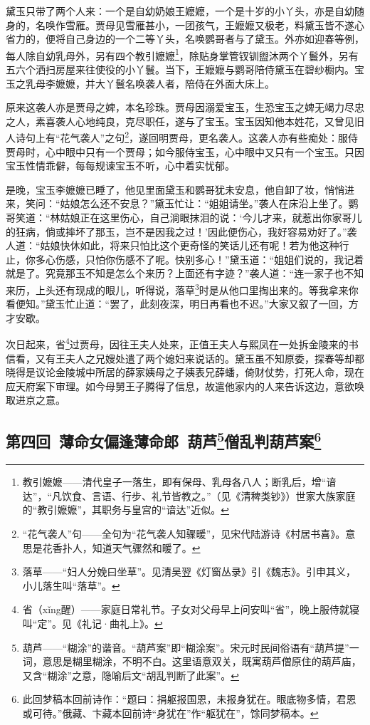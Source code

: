 \par 黛玉只带了两个人来：一个是自幼奶娘王嬷嬷，一个是十岁的小丫头，亦是自幼随身的，名唤作雪雁。贾母见雪雁甚小，一团孩气，王嬷嬷又极老，料黛玉皆不遂心省力的，便将自己身边的一个二等丫头，名唤鹦哥者与了黛玉。外亦如迎春等例，每人除自幼乳母外，另有四个教引嬷嬷\footnote{教引嬷嬷——清代皇子一落生，即有保母、乳母各八人；断乳后，增“谙达”，“凡饮食、言语、行步、礼节皆教之。”（见《清稗类钞》）世家大族家庭的“教引嬷嬷”，其职务与皇宫的“谙达”近似。}，除贴身掌管钗钏盥沐两个丫鬟外，另有五六个洒扫房屋来往使役的小丫鬟。当下，王嬷嬷与鹦哥陪侍黛玉在碧纱橱内。宝玉之乳母李嬷嬷，并大丫鬟名唤袭人者，陪侍在外面大床上。
\par 原来这袭人亦是贾母之婢，本名珍珠。贾母因溺爱宝玉，生恐宝玉之婢无竭力尽忠之人，素喜袭人心地纯良，克尽职任，遂与了宝玉。宝玉因知他本姓花，又曾见旧人诗句上有“花气袭人”之句\footnote{“花气袭人”句——全句为“花气袭人知骤暖”，见宋代陆游诗《村居书喜》。意思是花香扑人，知道天气骤然和暖了。}，遂回明贾母，更名袭人。这袭人亦有些痴处：服侍贾母时，心中眼中只有一个贾母；如今服侍宝玉，心中眼中又只有一个宝玉。只因宝玉性情乖僻，每每规谏宝玉不听，心中着实忧郁。
\par 是晚，宝玉李嬷嬷已睡了，他见里面黛玉和鹦哥犹未安息，他自卸了妆，悄悄进来，笑问：“姑娘怎么还不安息？”黛玉忙让：“姐姐请坐。”袭人在床沿上坐了。鹦哥笑道：“林姑娘正在这里伤心，自己淌眼抹泪的说：‘今儿才来，就惹出你家哥儿的狂病，倘或摔坏了那玉，岂不是因我之过！’因此便伤心，我好容易劝好了。”袭人道：“姑娘快休如此，将来只怕比这个更奇怪的笑话儿还有呢！若为他这种行止，你多心伤感，只怕你伤感不了呢。快别多心！”黛玉道：“姐姐们说的，我记着就是了。究竟那玉不知是怎么个来历？上面还有字迹？”袭人道：“连一家子也不知来历，上头还有现成的眼儿，听得说，落草\footnote{ 落草——“妇人分娩曰坐草”。见清吴翌《灯窗丛录》引《魏志》。引申其义，小儿落生叫“落草”。}时是从他口里掏出来的。等我拿来你看便知。”黛玉忙止道：“罢了，此刻夜深，明日再看也不迟。”大家又叙了一回，方才安歇。
\par 次日起来，省\footnote{省（xǐng醒）——家庭日常礼节。子女对父母早上问安叫“省”，晚上服侍就寝叫“定”。见《礼记·曲礼上》。}过贾母，因往王夫人处来，正值王夫人与熙凤在一处拆金陵来的书信看，又有王夫人之兄嫂处遣了两个媳妇来说话的。黛玉虽不知原委，探春等却都晓得是议论金陵城中所居的薛家姨母之子姨表兄薛蟠，倚财仗势，打死人命，现在应天府案下审理。如今母舅王子腾得了信息，故遣他家内的人来告诉这边，意欲唤取进京之意。

\clearpage
\subsection*{第四回\ 薄命女偏逢薄命郎\ 葫芦\footnote{葫芦——“糊涂”的谐音。“葫芦案”即“糊涂案”。宋元时民间俗语有“葫芦提”一词，意思是糊里糊涂，不明不白。这里语意双关，既寓葫芦僧原住的葫芦庙，又含“糊涂”之意，隐喻后文“胡乱判断了此案”。}僧乱判葫芦案\footnote{此回梦稿本回前诗作：“题曰：捐躯报国恩，未报身犹在。眼底物多情，君恩或可待。”俄藏、卞藏本回前诗“身犹在”作“躯犹在”，馀同梦稿本。}}


